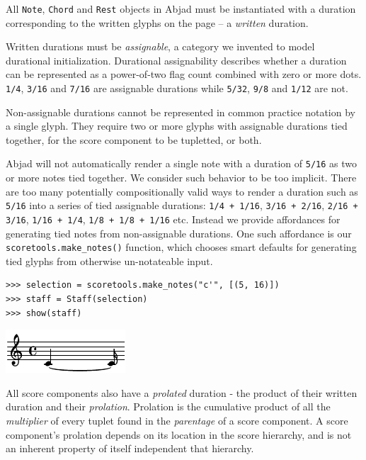 
All \texttt{Note}, \texttt{Chord} and \texttt{Rest} objects in Abjad must be
instantiated with a duration corresponding to the written glyphs on the page --
a \emph{written} duration.

Written durations must be \emph{assignable}, a category we invented to model
durational initialization. Durational assignability describes whether a
duration can be represented as a power-of-two flag count combined with zero or
more dots. \texttt{1/4}, \texttt{3/16} and \texttt{7/16} are assignable
durations while \texttt{5/32}, \texttt{9/8} and \texttt{1/12} are not.

Non-assignable durations cannot be represented in common practice notation by a
single glyph. They require two or more glyphs with assignable durations tied
together, for the score component to be tupletted, or both.

Abjad will not automatically render a single note with a duration of
\texttt{5/16} as two or more notes tied together. We consider such behavior to
be too implicit. There are too many potentially compositionally valid ways to
render a duration such as \texttt{5/16} into a series of tied assignable
durations: \texttt{1/4 + 1/16}, \texttt{3/16 + 2/16}, \texttt{2/16 + 3/16},
\texttt{1/16 + 1/4}, \texttt{1/8 + 1/8 + 1/16} etc. Instead we provide
affordances for generating tied notes from non-assignable durations. One such
affordance is our \texttt{scoretools.make\_notes()} function, which chooses
smart defaults for generating tied glyphs from otherwise un-notateable input.

\begin{lstlisting}
>>> selection = scoretools.make_notes("c'", [(5, 16)])
>>> staff = Staff(selection)
>>> show(staff)
\end{lstlisting}

\includegraphics[scale=1.0]{images/section_2_notational_isomorphism-3.pdf}


All score components also have a \emph{prolated} duration - the product of
their written duration and their \emph{prolation}. Prolation is the cumulative
product of all the \emph{multiplier} of every tuplet found in the
\emph{parentage} of a score component. A score component's prolation depends on
its location in the score hierarchy, and is not an inherent property of itself
independent that hierarchy.

